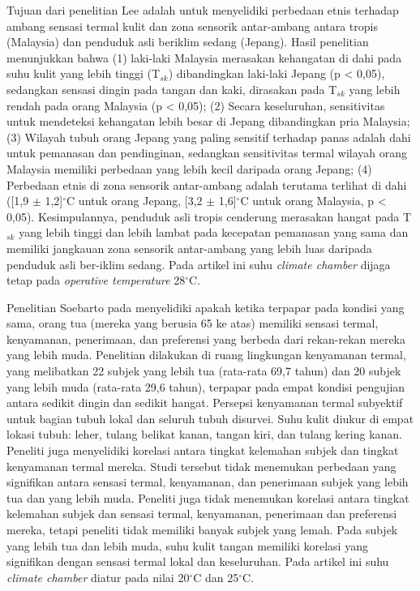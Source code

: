 Tujuan dari penelitian Lee \cite{paper21JYLee} adalah untuk menyelidiki perbedaan etnis terhadap ambang sensasi termal kulit dan zona sensorik antar-ambang antara tropis (Malaysia) dan penduduk asli beriklim sedang (Jepang). Hasil penelitian menunjukkan bahwa (1) laki-laki Malaysia merasakan kehangatan di dahi pada suhu kulit yang lebih tinggi (T$_{sk}$) dibandingkan laki-laki Jepang (p < 0,05), sedangkan sensasi dingin pada tangan dan kaki, dirasakan pada T$_{sk}$ yang lebih rendah pada orang Malaysia (p < 0,05); (2) Secara keseluruhan, sensitivitas untuk mendeteksi kehangatan lebih besar di Jepang dibandingkan pria Malaysia; (3) Wilayah tubuh orang Jepang yang paling sensitif terhadap panas adalah dahi untuk pemanasan dan pendinginan, sedangkan sensitivitas termal wilayah orang Malaysia memiliki perbedaan yang lebih kecil daripada orang Jepang; (4) Perbedaan etnis di zona sensorik antar-ambang adalah terutama terlihat di dahi ([1,9 $\pm$ 1,2]$^\circ$C untuk orang Jepang, [3,2 $\pm$ 1,6]$^\circ$C untuk orang Malaysia, p < 0,05). Kesimpulannya, penduduk asli tropis cenderung merasakan hangat pada T$_{sk}$ yang lebih tinggi dan lebih lambat pada kecepatan pemanasan yang sama dan memiliki jangkauan zona sensorik antar-ambang yang lebih luas daripada penduduk asli ber-iklim sedang. Pada artikel ini suhu \textit{climate chamber} dijaga tetap pada \textit{operative temperature} 28$^\circ$C.

Penelitian Soebarto pada \cite{paper21Veronica} menyelidiki apakah ketika terpapar pada kondisi yang sama, orang tua (mereka yang berusia 65 ke atas) memiliki sensasi termal, kenyamanan, penerimaan, dan preferensi yang berbeda dari rekan-rekan mereka yang lebih muda. Penelitian dilakukan di ruang lingkungan kenyamanan termal, yang melibatkan 22 subjek yang lebih tua (rata-rata 69,7 tahun) dan 20 subjek yang lebih muda (rata-rata 29,6 tahun), terpapar pada empat kondisi pengujian antara sedikit dingin dan sedikit hangat. Persepsi kenyamanan termal subyektif untuk bagian tubuh lokal dan seluruh tubuh disurvei. Suhu kulit diukur di empat lokasi tubuh: leher, tulang belikat kanan, tangan kiri, dan tulang kering kanan. Peneliti juga menyelidiki korelasi antara tingkat kelemahan subjek dan tingkat kenyamanan termal mereka. Studi tersebut tidak menemukan perbedaan yang signifikan antara sensasi termal, kenyamanan, dan penerimaan subjek yang lebih tua dan yang lebih muda. Peneliti juga tidak menemukan korelasi antara tingkat kelemahan subjek dan sensasi termal, kenyamanan, penerimaan dan preferensi mereka, tetapi peneliti tidak memiliki banyak subjek yang lemah. Pada subjek yang lebih tua dan lebih muda, suhu kulit tangan memiliki korelasi yang signifikan dengan sensasi termal lokal dan keseluruhan. Pada artikel ini suhu \textit{climate chamber} diatur pada nilai 20$^\circ$C dan 25$^\circ$C.

